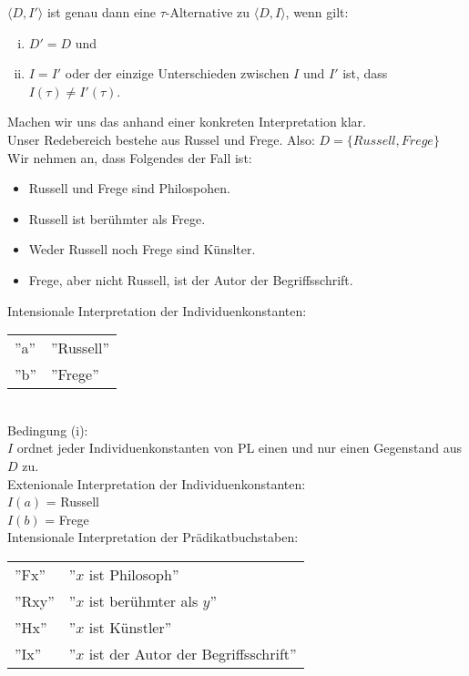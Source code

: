 \documentclass{scrartcl}
\begin{document}
$ \langle D,I' \rangle $ ist genau dann eine $ \tau $-Alternative zu $ \langle D,I \rangle $, wenn gilt:
\begin{enumerate}[(i)]
	\item $ D' = D $ und
	\item $ I = I' $ oder der einzige Unterschieden zwischen $ I $ und $ I' $ ist, dass $ I(\tau) \neq I'(\tau) $.
\end{enumerate}

Machen wir uns das anhand einer konkreten Interpretation klar. \\

Unser Redebereich bestehe aus Russel und Frege. Also: $ D = \{ Russell,Frege \} $ \\

Wir nehmen an, dass Folgendes der Fall ist:
\begin{itemize}
	\item Russell und Frege sind Philospohen.
	\item Russell ist berühmter als Frege.
	\item Weder Russell noch Frege sind Künslter.
	\item Frege, aber nicht Russell, ist der Autor der Begriffsschrift.
\end{itemize}

Intensionale Interpretation der Individuenkonstanten: \\

\begin{tabularx}{\linewidth}{l l}
	''a'' & ''Russell'' \\
	''b'' & ''Frege''
\end{tabularx} \\

Bedingung (i): \\
$ I $ ordnet jeder Individuenkonstanten von PL einen und nur einen Gegenstand aus $ D $ zu. \\

Extenionale Interpretation der Individuenkonstanten: \\

$ I(a) $ = Russell \\
$ I(b) $ = Frege \\

Intensionale Interpretation der Prädikatbuchstaben: \\

\begin{tabularx}{\linewidth}{l l}
	''Fx'' & ''$ x $ ist Philosoph'' \\
	''Rxy'' & ''$ x $ ist berühmter als $ y $'' \\
	''Hx'' & ''$ x $ ist Künstler'' \\
	''Ix'' & ''$ x $ ist der Autor der Begriffsschrift''
\end{tabularx} \\
\end{document}
